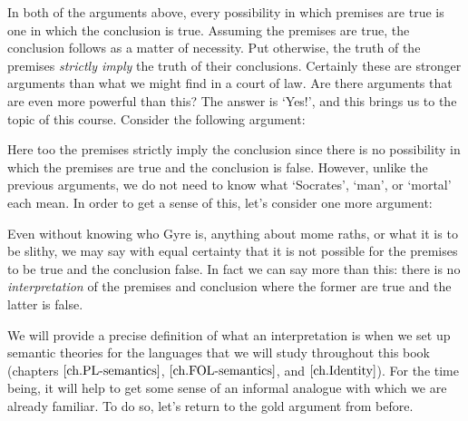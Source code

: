 \begin{earg}
\end{earg}


\begin{earg}
\end{earg}

In both of the arguments above, every possibility in which premises are true is one in which the conclusion is true.
Assuming the premises are true, the conclusion follows as a matter of necessity.
Put otherwise, the truth of the premises \emph{strictly imply} the truth of their conclusions.
Certainly these are stronger arguments than what we might find in a court of law.
Are there arguments that are even more powerful than this?
The answer is `Yes!', and this brings us to the topic of this course.
Consider the following argument:

\begin{earg}
\end{earg}

Here too the premises strictly imply the conclusion since there is no possibility in which the premises are true and the conclusion is false.
However, unlike the previous arguments, we do not need to know what `Socrates', `man', or `mortal' each mean.
In order to get a sense of this, let's consider one more argument:

\begin{earg}
\end{earg}

Even without knowing who Gyre is, anything about mome raths, or what it is to be slithy, we may say with equal certainty that it is not possible for the premises to be true and the conclusion false.
In fact we can say more than this: there is no \textit{interpretation} of the premises and conclusion where the former are true and the latter is false.

We will provide a precise definition of what an interpretation is when we set up semantic theories for the languages that we will study throughout this book (chapters $\ref{ch.PL-semantics}$, $\ref{ch.FOL-semantics}$, and $\ref{ch.Identity}$).
For the time being, it will help to get some sense of an informal analogue with which we are already familiar.
To do so, let's return to the gold argument from before.

